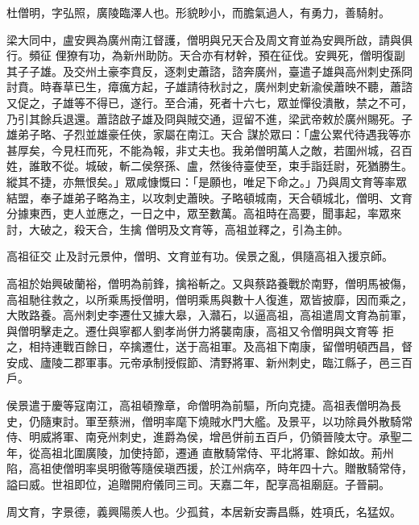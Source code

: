 
\begin{pinyinscope}

 杜僧明，字弘照，廣陵臨澤人也。形貌眇小，而膽氣過人，有勇力，善騎射。



 梁大同中，盧安興為廣州南江督護，僧明與兄天合及周文育並為安興所啟，請與俱行。頻征
 俚獠有功，為新州助防。天合亦有材幹，預在征伐。安興死，僧明復副其子子雄。及交州土豪李賁反，逐刺史蕭諮，諮奔廣州，臺遣子雄與高州刺史孫冏討賁。時春草已生，瘴癘方起，子雄請待秋討之，廣州刺史新渝侯蕭映不聽，蕭諮又促之，子雄等不得已，遂行。至合浦，死者十六七，眾並憚役潰散，禁之不可，乃引其餘兵退還。蕭諮啟子雄及冏與賊交通，逗留不進，梁武帝敕於廣州賜死。子雄弟子略、子烈並雄豪任俠，家屬在南江。天合
 謀於眾曰：「盧公累代待遇我等亦甚厚矣，今見枉而死，不能為報，非丈夫也。我弟僧明萬人之敵，若圍州城，召百姓，誰敢不從。城破，斬二侯祭孫、盧，然後待臺使至，束手詣廷尉，死猶勝生。縱其不捷，亦無恨矣。」眾咸慷慨曰：「是願也，唯足下命之。」乃與周文育等率眾結盟，奉子雄弟子略為主，以攻刺史蕭映。子略頓城南，天合頓城北，僧明、文育分據東西，吏人並應之，一日之中，眾至數萬。高祖時在高要，聞事起，率眾來討，大破之，殺天合，生擒
 僧明及文育等，高祖並釋之，引為主帥。



 高祖征交止及討元景仲，僧明、文育並有功。侯景之亂，俱隨高祖入援京師。



 高祖於始興破蘭裕，僧明為前鋒，擒裕斬之。又與蔡路養戰於南野，僧明馬被傷，高祖馳往救之，以所乘馬授僧明，僧明乘馬與數十人復進，眾皆披靡，因而乘之，大敗路養。高州刺史李遷仕又據大皋，入灨石，以逼高祖，高祖遣周文育為前軍，與僧明擊走之。遷仕與寧都人劉孝尚併力將襲南康，高祖又令僧明與文育等
 拒之，相持連戰百餘日，卒擒遷仕，送于高祖軍。及高祖下南康，留僧明頓西昌，督安成、廬陵二郡軍事。元帝承制授假節、清野將軍、新州刺史，臨江縣子，邑三百戶。



 侯景遣于慶等寇南江，高祖頓豫章，命僧明為前驅，所向克捷。高祖表僧明為長史，仍隨東討。軍至蔡洲，僧明率麾下燒賊水門大艦。及景平，以功除員外散騎常侍、明威將軍、南兗州刺史，進爵為侯，增邑併前五百戶，仍領晉陵太守。承聖二年，從高祖北圍廣陵，加使持節，遷通
 直散騎常侍、平北將軍、餘如故。荊州陷，高祖使僧明率吳明徹等隨侯瑱西援，於江州病卒，時年四十六。贈散騎常侍，謚曰威。世祖即位，追贈開府儀同三司。天嘉二年，配享高祖廟庭。子晉嗣。



 周文育，字景德，義興陽羨人也。少孤貧，本居新安壽昌縣，姓項氏，名猛奴。




\end{pinyinscope}
